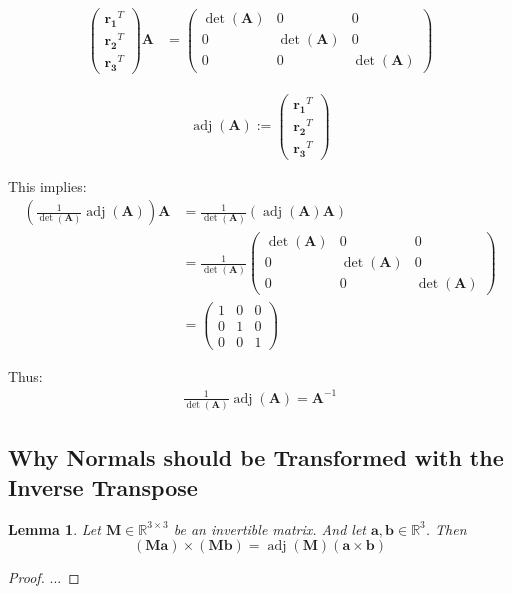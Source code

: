 \documentclass{article}
\newtheorem{lemma}{Lemma}
\newcommand{\R}{\mathbb{R}}
\newcommand{\vctr}[1]{\mathbf{#1}}
\newcommand{\mat}[1]{\mathbf{#1}}
\DeclareMathOperator{\adj}{adj}
\begin{document}
\begin{align*}
\begin{pmatrix}
\vctr{r_1}^T\\
\vctr{r_2}^T\\
\vctr{r_3}^T
\end{pmatrix} \mat{A} &= 
\begin{pmatrix}
\det(\mat{A}) & 0 & 0\\
0 & \det(\mat{A}) & 0\\
0 & 0 & \det(\mat{A})
\end{pmatrix}
\end{align*}

\begin{align*}
\adj(\mat{A}) := \begin{pmatrix}
\vctr{r_1}^T\\
\vctr{r_2}^T\\
\vctr{r_3}^T
\end{pmatrix}
\end{align*}


This implies:
\begin{align*}
\left(\frac{1}{\det(\mat{A})}\adj(\mat{A})\right)\mat{A} &= \frac{1}{\det(\mat{A})}\left(\adj(\mat{A})\mat{A}\right)\\
&=\frac{1}{\det(\mat{A})}\begin{pmatrix}
\det(\mat{A}) & 0 & 0\\
0 & \det(\mat{A}) & 0\\
0 & 0 & \det(\mat{A})
\end{pmatrix}\\
&= \begin{pmatrix}
1& 0 & 0\\
0 & 1 & 0\\
0 & 0 & 1
\end{pmatrix}
\end{align*}

Thus:
\begin{align*}
\frac{1}{\det(\mat{A})}\adj(\mat{A}) = \mat{A}^{-1}
\end{align*}

\subsection{Why Normals should be Transformed with the Inverse Transpose}

\begin{lemma}
Let \(\mat{M} \in \R^{3\times 3}\) be an invertible matrix. And let \(\vctr{a}, \vctr{b} \in \R^3\). Then
\[
(\mat{M}\vctr{a})\times(\mat{M}\vctr{b}) = \adj(\mat{M}) (\vctr{a} \times \vctr{b})
\]
\end{lemma}
\begin{proof}
 ...
\end{proof}
\end{document}
